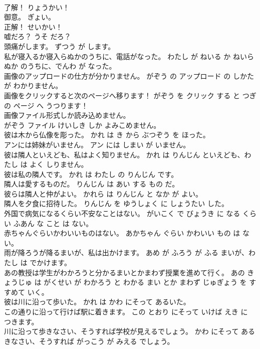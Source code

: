 \documentclass[8pt]{extreport}
\begin{document}
\begin{CJK}{UTF8}{min}
\\	了解！	りょうかい！	
\\	御意。	ぎょい。	
\\	正解！	せいかい！	
\\	嘘だろ？	うそ だろ？	
\\	頭痛がします。	ずつう が します。	
\\	私が寝入るか寝入らぬかのうちに、電話がなった。	わたし が ねいる か ねいらぬか のうちに、でんわ が なった。	
\\	画像のアップロードの仕方が分かりません。	がぞう の アップロード の しかた が わかりません。	
\\	画像をクリックすると次のページへ移ります！	がぞう を クリック する と つぎ の ページ へ うつります！	
\\	画像ファイル形式しか読み込めません。	
\\	がぞう ファイル けいしき しか よみこめません。	
\\	彼は木から仏像を彫った。	かれ は き から ぶつぞう を ほった。	
\\	アンには姉妹がいません。	アン には しまい が いません。	
\\	彼は隣人といえども、私はよく知りません。	かれ は りんじん といえども、わたし は よく しりません。	
\\	彼は私の隣人です。	かれ は わたし の りんじん です。	
\\	隣人は愛するものだ。	りんじん は あい する もの だ。	
\\	彼らは隣人と仲がよい。	かれら は りんじん と なか が よい。	
\\	隣人を夕食に招待した。	りんじん を ゆうしょく に しょうたい した。	
\\	外国で病気になるくらい不安なことはない。	がいこく で びょうき に なる くらい ふあん な こと は ない。	
\\	赤ちゃんぐらいかわいいものはない。	あかちゃん ぐらい かわいい もの は ない。	
\\	雨が降ろうが降るまいが、私は出かけます。	あめ が ふろう が ふる まいが、わたし は でかけます。	
\\	あの教授は学生がわかろうと分かるまいとかまわず授業を進めて行く。	あの きょうじゅ は がくせい が わかろう と わかる まい とか まわず じゅぎょう を すすめて いく。	
\\	彼は川に沿って歩いた。	かれ は かわ にそって あるいた。	
\\	この通りに沿って行けば駅に着きます。	この とおり にそって いけば えき に つきます。	
\\	川に沿って歩きなさい、そうすれば学校が見えるでしょう。	かわ にそって あるきなさい、そうすれば がっこう が みえる でしょう。	

\end{CJK}
\end{document}
